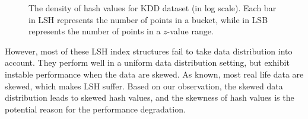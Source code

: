 \begin{figure}[!t]
\vspace{-0.1in}
	\centerline{
    \hspace{-0.1in}
    }
    \vspace{-0.05in}
	\caption{The density of hash values for KDD dataset (in log scale). Each bar in LSH represents the number of points in a bucket, while in LSB represents the number of points in a $z$-value range.}
	\label{fig:densitydist}
\vspace{-0.2in}
\end{figure}


However, most of these LSH index structures fail to take data distribution into account. They perform well in a uniform data distribution setting, but exhibit instable performance when the data are skewed. As known, most real life data are skewed, which makes LSH suffer. Based on our observation, the skewed data distribution leads to skewed hash values, and the skewness of hash values is the potential reason for the performance degradation.

